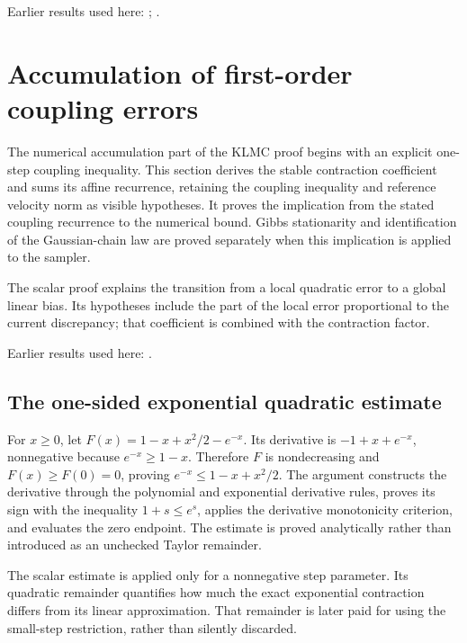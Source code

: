 \documentclass[11pt,a4paper]{report}
\begin{document}
Earlier results used here: \cite[Section~3.13.2]{LangevinLean2026ULASC}; \cite[Section~3.13.5]{LangevinLean2026ULASC}.
\section{\texorpdfstring{Accumulation of first-order coupling errors}{Accumulation of first-order coupling errors}}
\label{proof-module-KineticLangevin-Recurrence-lean}


The numerical accumulation part of the KLMC proof begins with an explicit one-step coupling inequality. This section derives the stable contraction coefficient and sums its affine recurrence, retaining the coupling inequality and reference velocity norm as visible hypotheses. It proves the implication from the stated coupling recurrence to the numerical bound. Gibbs stationarity and identification of the Gaussian-chain law are proved separately when this implication is applied to the sampler.



The scalar proof explains the transition from a local quadratic error to a global linear bias. Its hypotheses include the part of the local error proportional to the current discrepancy; that coefficient is combined with the contraction factor.



Earlier results used here: \cite[Section~3.15]{LangevinLean2026ULASC}.
\subsection{\texorpdfstring{The one-sided exponential quadratic estimate}{The one-sided exponential quadratic estimate}}
\label{report-step-KineticLangevin-Recurrence-lean-1}


For \(x\ge0\), let \(F(x)=1-x+x^2/2-e^{-x}\). Its derivative is \(-1+x+e^{-x}\), nonnegative because \(e^{-x}\ge1-x\). Therefore \(F\) is nondecreasing and \(F(x)\ge F(0)=0\), proving \(e^{-x}\le1-x+x^2/2\). The argument constructs the derivative through the polynomial and exponential derivative rules, proves its sign with the inequality \(1+s\le e^s\), applies the derivative monotonicity criterion, and evaluates the zero endpoint. The estimate is proved analytically rather than introduced as an unchecked Taylor remainder.



The scalar estimate is applied only for a nonnegative step parameter. Its quadratic remainder quantifies how much the exact exponential contraction differs from its linear approximation. That remainder is later paid for using the small-step restriction, rather than silently discarded.
\end{document}
